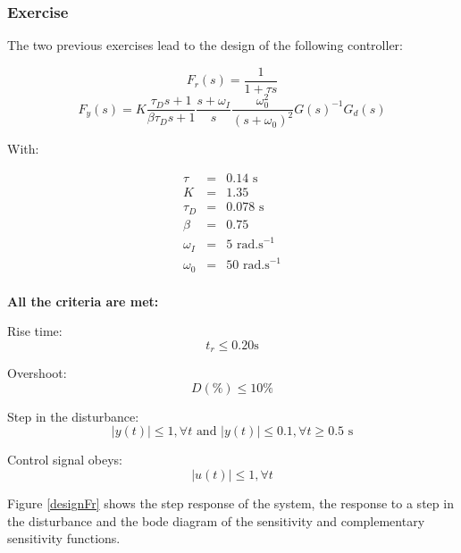 \subsubsection{Exercise}

The two previous exercises lead to the design of the following controller:

$$F_r(s) = \frac{1}{1 + \tau s}$$
$$F_y(s) = K \frac{\tau_D s + 1}{\beta \tau_D s +1}\frac{s + \omega_I}{s} \frac{\omega_0^2}{(s+\omega_0)^2}G(s)^{-1} G_d(s)$$

With:

$$\begin{array}{rcl}
    \tau & = & 0.14 \text{ s}\\ 
    K &  = & 1.35\\
    \tau_D &  = & 0.078\text{ s}\\
    \beta &  = & 0.75\\
 \omega_I &  = & 5 \text{ rad.s}^{-1}\\
    \omega_0 &  = & 50 \text{ rad.s}^{-1}\\
\end{array}$$

\textbf{All the criteria are met:}

\begin{shortitemize}
    \item Rise time:
        $$t_r \leq 0.20\text{s}$$
    \item Overshoot:
        $$D(\%) \leq 10\%$$
    \item Step in the disturbance:
        $$|y(t)| \leq 1, \forall t \text{ and } |y(t)| \leq 0.1, \forall t \geq 0.5\text{ s}$$ 
    \item Control signal obeys:
        $$|u(t)| \leq 1, \forall t$$
\end{shortitemize}

Figure \ref{designFr} shows the step response of the system, the response to a step in the disturbance and the bode diagram of the sensitivity and complementary sensitivity functions.

